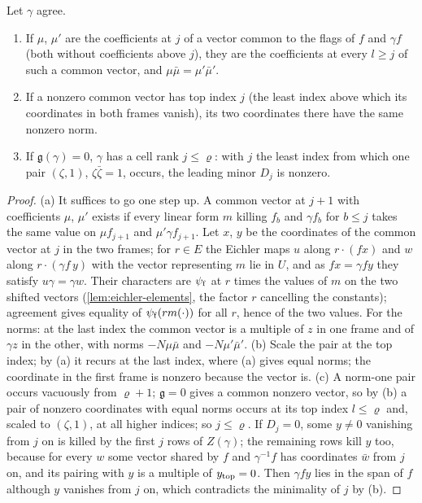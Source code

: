 \begin{lemma}\label{lem:common-vectors}
Let $\gamma$ agree.
\begin{enumerate}[label=\textup{(\alph*)}]
\item If $\mu$, $\mu'$ are the coefficients at $j$ of a vector common to the flags of $f$ and $\gamma f$ (both without coefficients above $j$), they are the coefficients at every $l\ge j$ of such a common vector, and $\mu\bar\mu=\mu'\bar\mu'$.
\item If a nonzero common vector has top index $j$ (the least index above which its coordinates in both frames vanish), its two coordinates there have the same nonzero norm.
\item If $\mathfrak g(\gamma)=0$, $\gamma$ has a cell rank $j\le\varrho$: with $j$ the least index from which one pair $(\zeta,1)$, $\zeta\bar\zeta=1$, occurs, the leading minor $D_j$ is nonzero.
\end{enumerate}
\end{lemma}

\begin{proof}
(a) It suffices to go one step up. A common vector at $j+1$ with coefficients $\mu$, $\mu'$ exists if every linear form $m$ killing $f_b$ and $\gamma f_b$ for $b\le j$ takes the same value on $\mu f_{j+1}$ and $\mu'\gamma f_{j+1}$. Let $x$, $y$ be the coordinates of the common vector
at $j$ in the two frames; for $r\in E$ the Eichler maps $u$ along $r\cdot(fx)$ and $w$ along $r\cdot(\gamma f\,y)$ with the vector representing $m$ lie in $U$, and as $fx=\gamma fy$ they satisfy $u\gamma=\gamma w$. Their characters are $\psi_{\rm f}$ at $r$ times the values of $m$ on the two shifted vectors
(\cref{lem:eichler-elements}, the factor $r$ cancelling the constants); agreement gives equality of $\psi_{\rm f}(rm(\cdot))$ for all $r$, hence of the two values. For the norms: at the last index the common vector is a multiple of $z$ in one frame and of $\gamma z$ in the
other, with norms $-N\mu\bar\mu$ and $-N\mu'\bar\mu'$. (b) Scale the pair at the top index; by (a) it recurs at the last index, where (a) gives equal norms; the coordinate in the first frame is nonzero because the vector is. (c) A norm-one pair occurs vacuously
from $\varrho+1$; $\mathfrak g=0$ gives a common nonzero vector, so by (b) a pair of nonzero coordinates with equal norms occurs at its top index $l\le\varrho$ and, scaled to $(\zeta,1)$, at all higher indices; so $j\le\varrho$. If $D_j=0$, some $y\ne0$ vanishing from $j$ on is killed by the
first $j$ rows of $Z(\gamma)$; the remaining rows kill $y$ too, because for every $w$ some vector shared by $f$ and $\gamma^{-1}f$ has coordinates $\bar w$ from $j$ on, and its pairing with $y$ is a multiple of $y_{\rm top}=0$. Then $\gamma fy$ lies in the span of $f$ although $y$
vanishes from $j$ on, which contradicts the minimality of $j$ by (b).
\end{proof}

